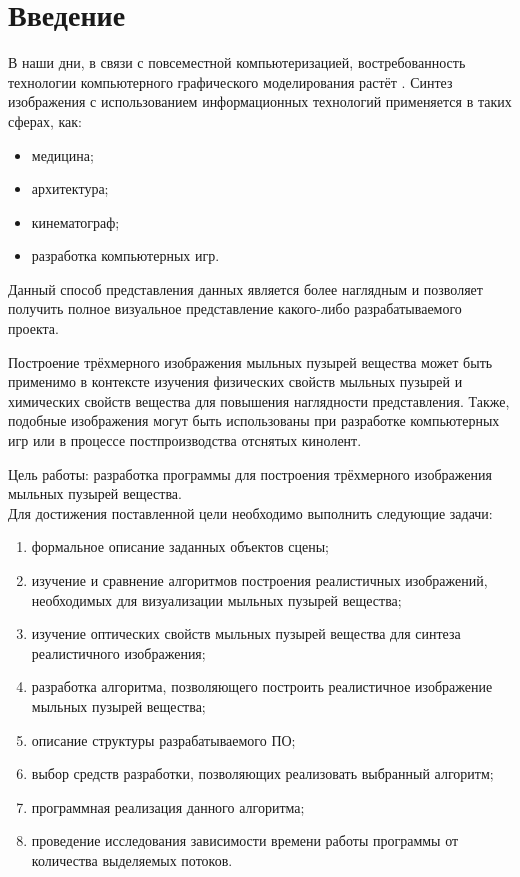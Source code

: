\setcounter{page}{4}
\chapter*{Введение}
В наши дни, в связи с повсеместной компьютеризацией, востребованность технологии компьютерного графического моделирования растёт \cite{web_item11}. Синтез изображения с использованием информационных технологий применяется в таких сферах, как:
\begin{itemize}
	\item медицина;
	\item архитектура;
	\item кинематограф;
	\item разработка компьютерных игр.
\end{itemize}

Данный способ представления данных является более наглядным и позволяет получить полное визуальное представление какого-либо разрабатываемого проекта. 

Построение трёхмерного изображения мыльных пузырей вещества может быть применимо в контексте изучения физических свойств мыльных пузырей и химических свойств вещества для повышения наглядности представления. Также, подобные изображения могут быть использованы при разработке компьютерных игр или в процессе постпроизводства отснятых кинолент.

Цель работы: разработка программы для построения трёхмерного изображения мыльных пузырей вещества.\\

Для достижения поставленной цели необходимо выполнить следующие задачи:
\begin{enumerate}[label={\arabic*)}]
	\item формальное описание заданных объектов сцены;
	\item изучение и сравнение алгоритмов построения реалистичных изображений, необходимых для визуализации мыльных пузырей вещества;
	\item изучение оптических свойств мыльных пузырей вещества для синтеза реалистичного изображения;
	\item разработка алгоритма, позволяющего построить реалистичное изображение мыльных пузырей вещества;
	\item описание структуры разрабатываемого ПО;
	\item выбор средств разработки, позволяющих реализовать выбранный алгоритм;
	\item программная реализация данного алгоритма;
	\item проведение исследования зависимости времени работы программы от количества выделяемых потоков.
\end{enumerate}

\newpage